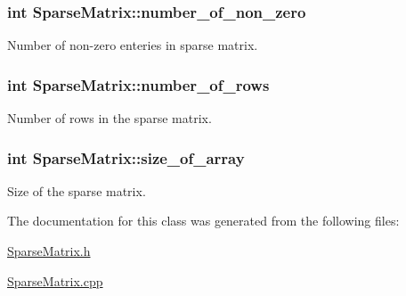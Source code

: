\subsubsection[{number\+\_\+of\+\_\+non\+\_\+zero}]{\setlength{\rightskip}{0pt plus 5cm}int Sparse\+Matrix\+::number\+\_\+of\+\_\+non\+\_\+zero\hspace{0.3cm}{\ttfamily [private]}}\label{class_sparse_matrix_aad150f4ad676a2919a478457e7c050d3}


Number of non-\/zero enteries in sparse matrix. 

\hypertarget{class_sparse_matrix_a5f84c3e572c129bbef55d4e9343abd1b}{}
\subsubsection[{number\+\_\+of\+\_\+rows}]{\setlength{\rightskip}{0pt plus 5cm}int Sparse\+Matrix\+::number\+\_\+of\+\_\+rows\hspace{0.3cm}{\ttfamily [private]}}\label{class_sparse_matrix_a5f84c3e572c129bbef55d4e9343abd1b}


Number of rows in the sparse matrix. 

\hypertarget{class_sparse_matrix_ab741b7b30296448a3f004d8a5c24fc33}{}
\subsubsection[{size\+\_\+of\+\_\+array}]{\setlength{\rightskip}{0pt plus 5cm}int Sparse\+Matrix\+::size\+\_\+of\+\_\+array\hspace{0.3cm}{\ttfamily [private]}}\label{class_sparse_matrix_ab741b7b30296448a3f004d8a5c24fc33}


Size of the sparse matrix. 



The documentation for this class was generated from the following files\+:\begin{DoxyCompactItemize}
\item 
\hyperlink{_sparse_matrix_8h}{Sparse\+Matrix.\+h}\item 
\hyperlink{_sparse_matrix_8cpp}{Sparse\+Matrix.\+cpp}\end{DoxyCompactItemize}
